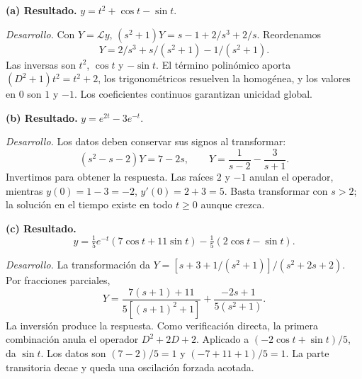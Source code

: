 \noindent\textbf{(a) Resultado.} \(y=t^2+\cos t-\sin t\).

\noindent\textit{Desarrollo.} Con \(Y=\mathcal L y\), \((s^2+1)Y=s-1+2/s^3+2/s\). Reordenamos
\[Y=2/s^3+s/(s^2+1)-1/(s^2+1).\]
Las inversas son \(t^2\), \(\cos t\) y \(-\sin t\). El término polinómico aporta \((D^2+1)t^2=t^2+2\), los trigonométricos resuelven la homogénea, y los valores en 0 son \(1\) y \(-1\). Los coeficientes continuos garantizan unicidad global.

\medskip

\noindent\textbf{(b) Resultado.} \(y=e^{2t}-3e^{-t}\).

\noindent\textit{Desarrollo.} Los datos deben conservar sus signos al transformar:
\[(s^2-s-2)Y=7-2s,\qquad Y=\frac1{s-2}-\frac3{s+1}.\]
Invertimos para obtener la respuesta. Las raíces \(2\) y \(-1\) anulan el operador, mientras \(y(0)=1-3=-2\), \(y'(0)=2+3=5\). Basta transformar con \(s>2\); la solución en el tiempo existe en todo \(t\ge0\) aunque crezca.

\medskip

\noindent\textbf{(c) Resultado.} \[y=\tfrac15e^{-t}(7\cos t+11\sin t)-\tfrac15(2\cos t-\sin t).\]

\noindent\textit{Desarrollo.} La transformación da \(Y=[s+3+1/(s^2+1)]/(s^2+2s+2)\). Por fracciones parciales,
\[Y=\frac{7(s+1)+11}{5[(s+1)^2+1]}+\frac{-2s+1}{5(s^2+1)}.\]
La inversión produce la respuesta. Como verificación directa, la primera combinación anula el operador \(D^2+2D+2\). Aplicado a \((-2\cos t+\sin t)/5\), da \(\sin t\). Los datos son \((7-2)/5=1\) y \((-7+11+1)/5=1\). La parte transitoria decae y queda una oscilación forzada acotada.
